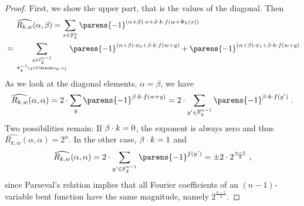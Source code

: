 \begin{proof}
    First, we show the upper part, that is the values of the diagonal.
    Then
    \begin{align*}
        &\hphantom{=}\ \ \widehat{R_{k,w}}(\alpha, \beta)
         = \sum_{x \in \F_2^{n}} \parens{-1}^{\iprod{(\alpha + \beta)}{x} + \iprod{\beta}{k}\cdot f(w + \Phi_k(x))} \\
        &= \sum_{\tower{y \in \F_2^{n-1}}{\Phi_k^{-1}(y) \in \set{x_0, x_1}}} \parens{-1}^{\iprod{(\alpha + \beta)}{x_0} + \iprod{\beta}{k}\cdot f(w + y)} + \parens{-1}^{\iprod{(\alpha + \beta)}{x_1} + \iprod{\beta}{k}\cdot f(w + y)}
    \end{align*}
    As we look at the diagonal elements, $\alpha = \beta$, we have
    \begin{align*}
    \widehat{R_{k,w}}(\alpha, \alpha)
    = 2 \cdot \sum_{y} \parens{-1}^{\iprod{\beta}{k} \cdot f(w + y)}
    = 2 \cdot \sum_{y^\prime \in \F_2^{n-1}} \parens{-1}^{\iprod{\beta}{k} \cdot f(y^\prime)}\;.
    \end{align*}
    Two possibilities remain:
    If $\beta \cdot k = 0$, the exponent is always zero and thus $\widehat{R_{k,w}}(\alpha, \alpha) = 2^n$.
    In the other case, $\beta \cdot k = 1$ and
    \begin{equation}\label{eqn:bison:lat_proof_adjust1}
        \widehat{R_{k,w}}(\alpha, \alpha) = 2 \cdot \sum_{y^\prime \in \F_2^{n-1}} \parens{-1}^{f(y^\prime)} = \pm 2 \cdot 2^{\frac{n-1}{2}}\;,
    \end{equation}
    since Parseval's relation implies that all Fourier coefficients of an $(n-1)$-variable bent function have the same magnitude, namely $2^{\frac{n-1}{2}}$.


\end{proof}
